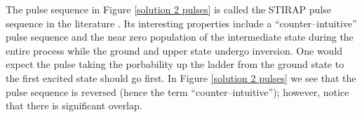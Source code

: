 The pulse sequence in Figure \ref{solution 2 pulses} is called the STIRAP pulse sequence in the literature \cite{Sola:1999a}. Its interesting properties include a ``counter--intuitive'' pulse sequence and the near zero population of the intermediate state during the entire process while the ground and upper state undergo inversion. One would expect the pulse taking the porbability up the ladder from the ground state to the first excited state should go first. In Figure \ref{solution 2 pulses} we see that the pulse sequence is reversed (hence the term ``counter--intuitive''); however, notice that there is significant overlap. 



